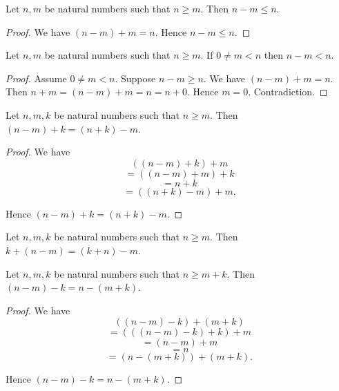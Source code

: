 \documentclass[10pt]{article}
\begin{document}
  \begin{forthel}
    \begin{proposition}
      Let $n, m$ be natural numbers such that $n \geq m$.
      Then $n - m \leq n$.
    \end{proposition}
    \begin{proof}
      We have $(n - m) + m = n$.
      Hence $n - m \leq n$.
    \end{proof}
  \end{forthel}

  \begin{forthel}
    \begin{proposition}
      Let $n, m$ be natural numbers such that $n \geq m$.
      If $0 \neq m < n$ then $n - m < n$.
    \end{proposition}
    \begin{proof}
      Assume $0 \neq m < n$.
      Suppose $n - m \geq n$.
      We have $(n - m) + m = n$.
      Then $n + m
        = (n - m) + m
        = n
        = n + 0$.
      Hence $m = 0$.
      Contradiction.
    \end{proof}
  \end{forthel}

  \begin{forthel}
    \begin{proposition}
      Let $n, m, k$ be natural numbers such that $n \geq m$.
      Then $(n - m) + k = (n + k) - m$.
    \end{proposition}
    \begin{proof}
      We have
      \[  ((n - m) + k) + m       \]
      \[    = ((n - m) + m) + k   \]
      \[    = n + k               \]
      \[    = ((n + k) - m) + m.  \]

      Hence $(n - m) + k = (n + k) - m$.
    \end{proof}
  \end{forthel}

  \begin{forthel}
    \begin{corollary}
      Let $n, m, k$ be natural numbers such that $n \geq m$.
      Then $k + (n - m) = (k + n) - m$.
    \end{corollary}
  \end{forthel}

  \begin{forthel}
    \begin{proposition}
      Let $n, m, k$ be natural numbers such that $n \geq  m + k$.
      Then $(n - m) - k = n - (m + k)$.
    \end{proposition}
    \begin{proof}
      We have
      \[  ((n - m) - k) + (m + k)       \]
      \[    = (((n - m) - k) + k) + m   \]
      \[    = (n - m) + m               \]
      \[    = n                         \]
      \[    = (n - (m + k)) + (m + k).  \]

      Hence $(n - m) - k = n - (m + k)$.
    \end{proof}
  \end{forthel}
\end{document}
